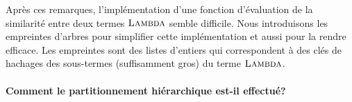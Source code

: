 Après ces remarques, l'implémentation d'une fonction d'évaluation de
la similarité entre deux termes $\textsc{Lambda}$ semble difficile. Nous introduisons
les empreintes d'arbres pour simplifier cette implémentation et aussi
pour la rendre efficace. Les empreintes sont des listes d'entiers qui
correspondent à des clés de hachages des sous-termes (suffisamment gros)
du terme $\textsc{Lambda}$.


\paragraph{Comment le partitionnement hiérarchique est-il effectué?}

